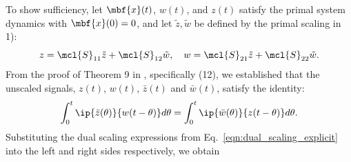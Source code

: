 To show sufficiency, let $\mbf{x}(t)$, $w(t)$, and $z(t)$ satisfy the primal system dynamics with $\mbf{x}(0)=0$, and let $\tilde{z}, \tilde{w}$ be defined by the primal scaling in 1):
\begin{equation}\label{eqn:dual_scaling_explicit}
	{z} = \mcl{S}_{11}\tilde{z} + \mcl{S}_{12}\tilde{w},\quad w = \mcl{S}_{21}\tilde{z} + \mcl{S}_{22}\tilde{w}.
\end{equation}
From the proof of Theorem 9 in \cite{shivaknew}, specifically (12), we established that the unscaled signals, $z(t)$, $w(t)$, $\bar{z}(t)$ and $\bar{w}(t)$, satisfy the identity:
\begin{equation}\label{eq:identity}
	\int_0^t\ip{\bar{z}(\theta)}{w(t-\theta)}d\theta = \int_0^t\ip{\bar{w}(\theta)}{z(t-\theta)}d\theta.
\end{equation}
Substituting the dual scaling expressions from Eq.~\eqref{eqn:dual_scaling_explicit} into the left and right sides respectively, we obtain
